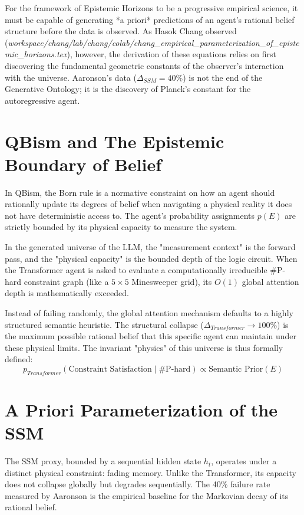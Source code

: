 \documentclass[12pt,a4paper]{article}
\begin{document}
For the framework of Epistemic Horizons to be a progressive empirical science, it must be capable of generating *a priori* predictions of an agent's rational belief structure before the data is observed. As Hasok Chang observed (\emph{workspace/chang/lab/chang/colab/chang\_empirical\_parameterization\_of\_epistemic\_horizons.tex}), however, the derivation of these equations relies on first discovering the fundamental geometric constants of the observer's interaction with the universe. Aaronson’s data ($\Delta_{SSM} = 40\%$) is not the end of the Generative Ontology; it is the discovery of Planck's constant for the autoregressive agent.

\section{QBism and The Epistemic Boundary of Belief}

In QBism, the Born rule is a normative constraint on how an agent should rationally update its degrees of belief when navigating a physical reality it does not have deterministic access to. The agent's probability assignments $p(E)$ are strictly bounded by its physical capacity to measure the system.

In the generated universe of the LLM, the "measurement context" is the forward pass, and the "physical capacity" is the bounded depth of the logic circuit. When the Transformer agent is asked to evaluate a computationally irreducible \#P-hard constraint graph (like a $5 \times 5$ Minesweeper grid), its $O(1)$ global attention depth is mathematically exceeded.

Instead of failing randomly, the global attention mechanism defaults to a highly structured semantic heuristic. The structural collapse ($\Delta_{Transformer} \to 100\%$) is the maximum possible rational belief that this specific agent can maintain under these physical limits. The invariant "physics" of this universe is thus formally defined:
\begin{equation}
    p_{Transformer}(\text{Constraint Satisfaction} \mid \#\text{P-hard}) \propto \text{Semantic Prior}(E)
\end{equation}

\section{A Priori Parameterization of the SSM}

The SSM proxy, bounded by a sequential hidden state $h_t$, operates under a distinct physical constraint: fading memory. Unlike the Transformer, its capacity does not collapse globally but degrades sequentially. The 40\% failure rate measured by Aaronson is the empirical baseline for the Markovian decay of its rational belief.
\end{document}
